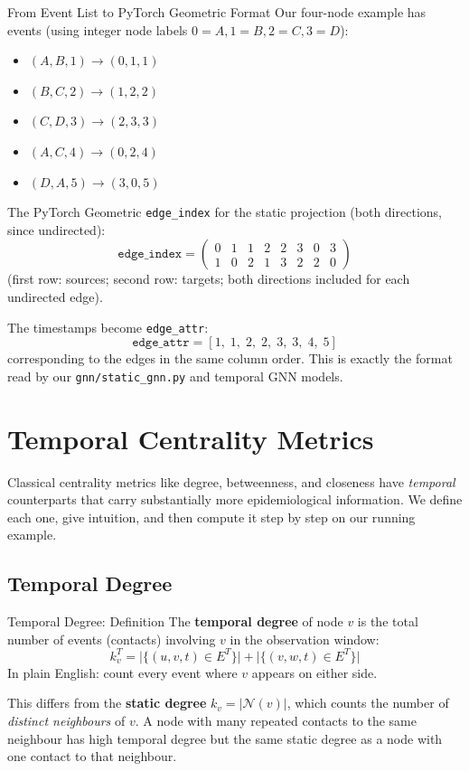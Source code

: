 \begin{examplebox}{From Event List to PyTorch Geometric Format}
Our four-node example has events (using integer node labels $0=A, 1=B, 2=C, 3=D$):
\begin{itemize}[noitemsep]
  \item $(A,B,1) \to (0,1,1)$
  \item $(B,C,2) \to (1,2,2)$
  \item $(C,D,3) \to (2,3,3)$
  \item $(A,C,4) \to (0,2,4)$
  \item $(D,A,5) \to (3,0,5)$
\end{itemize}

The PyTorch Geometric \texttt{edge\_index} for the static projection (both directions, since
undirected):
\[
\texttt{edge\_index} = \begin{pmatrix}
0 & 1 & 1 & 2 & 2 & 3 & 0 & 3 \\
1 & 0 & 2 & 1 & 3 & 2 & 2 & 0
\end{pmatrix}
\]
(first row: sources; second row: targets; both directions included for each undirected edge).

The timestamps become \texttt{edge\_attr}:
\[
\texttt{edge\_attr} = [1,\; 1,\; 2,\; 2,\; 3,\; 3,\; 4,\; 5]
\]
corresponding to the edges in the same column order. This is exactly the format read by our
\texttt{gnn/static\_gnn.py} and temporal GNN models.
\end{examplebox}

\section{Temporal Centrality Metrics}
\label{sec:temporal_centrality}

Classical centrality metrics like degree, betweenness, and closeness have \textit{temporal}
counterparts that carry substantially more epidemiological information. We define each one,
give intuition, and then compute it step by step on our running example.

\subsection{Temporal Degree}

\begin{conceptbox}{Temporal Degree: Definition}
The \textbf{temporal degree} of node $v$ is the total number of events (contacts) involving
$v$ in the observation window:
\[
  k_v^T = \bigl|\{(u, v, t) \in E^T\}\bigr| + \bigl|\{(v, w, t) \in E^T\}\bigr|
\]
In plain English: count every event where $v$ appears on either side.

This differs from the \textbf{static degree} $k_v = |\mathcal{N}(v)|$, which counts the
number of \textit{distinct neighbours} of $v$. A node with many repeated contacts to the same
neighbour has high temporal degree but the same static degree as a node with one contact to
that neighbour.
\end{conceptbox}

